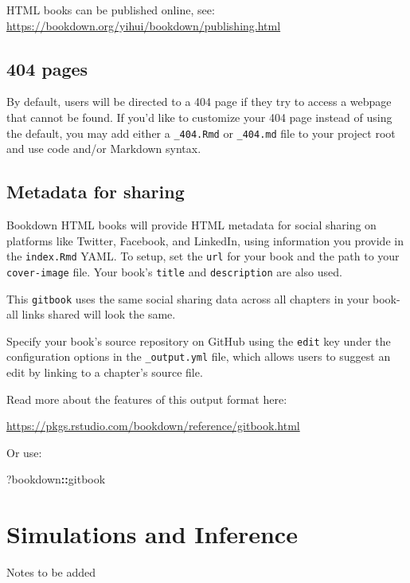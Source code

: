 \documentclass[
]{book}
\newenvironment{Shaded}{\begin{snugshade}}{\end{snugshade}}
\newcommand{\NormalTok}[1]{#1}
\newcommand{\SpecialCharTok}[1]{\textcolor[rgb]{0.81,0.36,0.00}{\textbf{#1}}}
\theoremstyle{definition}
\theoremstyle{definition}
\theoremstyle{definition}
\theoremstyle{definition}
\theoremstyle{remark}
\begin{document}
HTML books can be published online, see: \url{https://bookdown.org/yihui/bookdown/publishing.html}

\hypertarget{pages}{%
\section{404 pages}\label{pages}}

By default, users will be directed to a 404 page if they try to access a webpage that cannot be found. If you'd like to customize your 404 page instead of using the default, you may add either a \texttt{\_404.Rmd} or \texttt{\_404.md} file to your project root and use code and/or Markdown syntax.

\hypertarget{metadata-for-sharing}{%
\section{Metadata for sharing}\label{metadata-for-sharing}}

Bookdown HTML books will provide HTML metadata for social sharing on platforms like Twitter, Facebook, and LinkedIn, using information you provide in the \texttt{index.Rmd} YAML. To setup, set the \texttt{url} for your book and the path to your \texttt{cover-image} file. Your book's \texttt{title} and \texttt{description} are also used.

This \texttt{gitbook} uses the same social sharing data across all chapters in your book- all links shared will look the same.

Specify your book's source repository on GitHub using the \texttt{edit} key under the configuration options in the \texttt{\_output.yml} file, which allows users to suggest an edit by linking to a chapter's source file.

Read more about the features of this output format here:

\url{https://pkgs.rstudio.com/bookdown/reference/gitbook.html}

Or use:

\begin{Shaded}
\begin{Highlighting}[]
\NormalTok{?bookdown}\SpecialCharTok{::}\NormalTok{gitbook}
\end{Highlighting}
\end{Shaded}

\hypertarget{simulations-and-inference}{%
\chapter{Simulations and Inference}\label{simulations-and-inference}}

Notes to be added

  
\end{document}

